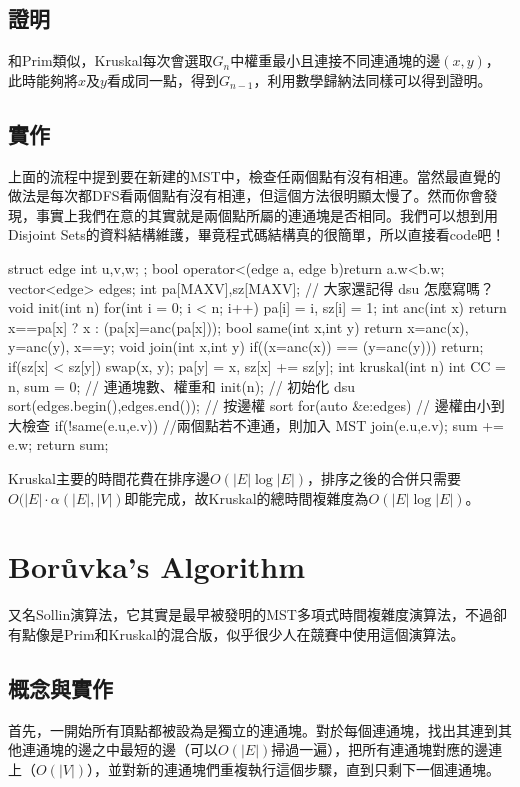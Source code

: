 \subsection{證明}
和Prim類似，Kruskal每次會選取$G_n$中權重最小且連接不同連通塊的邊$(x, y)$，此時能夠將$x$及$y$看成同一點，得到$G_{n-1}$，利用數學歸納法同樣可以得到證明。
\subsection{實作}
上面的流程中提到要在新建的MST中，檢查任兩個點有沒有相連。當然最直覺的做法是每次都DFS看兩個點有沒有相連，但這個方法很明顯太慢了。然而你會發現，事實上我們在意的其實就是兩個點所屬的連通塊是否相同。我們可以想到用Disjoint Sets的資料結構維護，畢竟程式碼結構真的很簡單，所以直接看code吧！
\begin{C++}
struct edge{
    int u,v,w;
};
bool operator<(edge a, edge b){return a.w<b.w;}
vector<edge> edges;
int pa[MAXV],sz[MAXV]; // 大家還記得 dsu 怎麼寫嗎？
void init(int n) {
    for(int i = 0; i < n; i++) pa[i] = i, sz[i] = 1;
}
int anc(int x){
    return x==pa[x] ? x : (pa[x]=anc(pa[x]));
}
bool same(int x,int y){
    return x=anc(x), y=anc(y), x==y;
}
void join(int x,int y){
    if((x=anc(x)) == (y=anc(y))) return;
    if(sz[x] < sz[y]) swap(x, y);
    pa[y] = x, sz[x] += sz[y];
}
int kruskal(int n){
    int CC = n, sum = 0; // 連通塊數、權重和
    init(n); // 初始化 dsu
    sort(edges.begin(),edges.end()); // 按邊權 sort
    for(auto &e:edges) { // 邊權由小到大檢查
    	if(!same(e.u,e.v)) {//兩個點若不連通，則加入 MST
    		join(e.u,e.v);
    		sum += e.w;
    	}
    }
    return sum;
}
\end{C++}
Kruskal主要的時間花費在排序邊$O(|E|\log|E|)$，排序之後的合併只需要$O(|E|\cdot\alpha(|E|,|V|)$即能完成，故Kruskal的總時間複雜度為$O(|E|\log|E|)$。

\section{Borůvka's Algorithm}
又名Sollin演算法，它其實是最早被發明的MST多項式時間複雜度演算法，不過卻有點像是Prim和Kruskal的混合版，似乎很少人在競賽中使用這個演算法。

\subsection{概念與實作}
首先，一開始所有頂點都被設為是獨立的連通塊。對於每個連通塊，找出其連到其他連通塊的邊之中最短的邊（可以$O(|E|)$掃過一遍），把所有連通塊對應的邊連上（$O(|V|)$），並對新的連通塊們重複執行這個步驟，直到只剩下一個連通塊。

